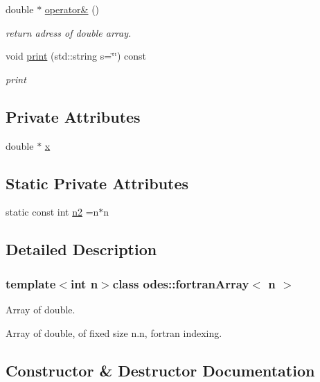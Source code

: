 \begin{DoxyCompactItemize}
\item 
double $\ast$ \hyperlink{classodes_1_1fortranArray_afc0615001fbb2d11c67e33c947478ad7}{operator\&} ()
\begin{DoxyCompactList}\small\item\em return adress of double array. \end{DoxyCompactList}\item 
void \hyperlink{classodes_1_1fortranArray_ab119083abce68d9a216909784f42821d}{print} (std\+::string s=\char`\"{}\char`\"{}) const 
\begin{DoxyCompactList}\small\item\em print \end{DoxyCompactList}\end{DoxyCompactItemize}
\subsection*{Private Attributes}
\begin{DoxyCompactItemize}
\item 
double $\ast$ \hyperlink{classodes_1_1fortranArray_a71fc035c3f3ff899674122533b6713c1}{x}
\end{DoxyCompactItemize}
\subsection*{Static Private Attributes}
\begin{DoxyCompactItemize}
\item 
static const int \hyperlink{classodes_1_1fortranArray_a730a0a23dd09551539653ee6fd2c973d}{n2} =n$\ast$n
\end{DoxyCompactItemize}


\subsection{Detailed Description}
\subsubsection*{template$<$int n$>$class odes\+::fortran\+Array$<$ n $>$}

Array of double. 

Array of double, of fixed size n.\+n, fortran indexing. 

\subsection{Constructor \& Destructor Documentation}
\hypertarget{classodes_1_1fortranArray_a8df00fb51f372f5094232edcef336c3f}{}
